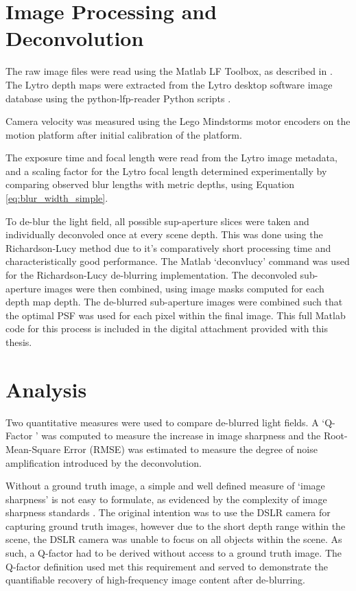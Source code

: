 \section{Image Processing and Deconvolution}
\label{sec:image_processing_and_deconvolution}

The raw image files were read using the Matlab LF Toolbox, as described in \cite{dansereau2013toolbox}.
The Lytro depth maps were extracted from the Lytro desktop software image database using the python-lfp-reader Python scripts \cite{esfahbod2013python}.

Camera velocity was measured using the Lego Mindstorms motor encoders on the motion platform after initial calibration of the platform.

The exposure time and focal length were read from the Lytro image metadata, and a scaling factor for the Lytro focal length determined experimentally by comparing observed blur lengths with metric depths, using Equation \ref{eq:blur_width_simple}.

To de-blur the light field, all possible sup-aperture slices were taken and individually deconvoled once at every scene depth.
This was done using the Richardson-Lucy method due to it's comparatively short processing time and characteristically good performance.
The Matlab \enquote*{deconvlucy} command was used for the Richardson-Lucy de-blurring implementation.
The deconvoled sub-aperture images were then combined, using image masks computed for each depth map depth.
The de-blurred sub-aperture images were combined such that the optimal PSF was used for each pixel within the final image.
This full Matlab code for this process is included in the digital attachment provided with this thesis.

\section{Analysis}
\label{sec:analysis}

Two quantitative measures were used to compare de-blurred light fields.
A \enquote*{Q-Factor	} was computed to measure the increase in image sharpness and the Root-Mean-Square Error (RMSE) was estimated to measure the degree of noise amplification introduced by the deconvolution.

Without a ground truth image, a simple and well defined measure of \enquote*{image sharpness} is not easy to formulate, as evidenced by the complexity of image sharpness standards \cite{imatest2014sharpness}.
The original intention was to use the DSLR camera for capturing ground truth images, however due to the short depth range within the scene, the DSLR camera was unable to focus on all objects within the scene.
As such, a Q-factor had to be derived without access to a ground truth image.
The Q-factor definition used met this requirement and served to demonstrate the quantifiable recovery of high-frequency image content after de-blurring.

